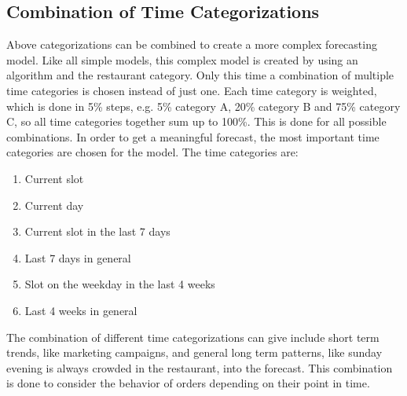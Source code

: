 \subsection{Combination of Time Categorizations}\label{subsection:Categorizing by Order}
Above categorizations can be combined to create a more complex forecasting model. Like all simple models, this complex model is created by using an algorithm and the restaurant category. Only this time a combination of multiple time categories is chosen instead of just one. Each time category is weighted, which is done in 5\% steps, e.g. 5\% category A, 20\% category B and 75\% category C, so all time categories together sum up to 100\%.  This is done for all possible combinations. In order to get a meaningful forecast, the most important time categories are chosen for the model. The time categories are:
\begin{enumerate}
\item Current slot
\item Current day
\item Current slot in the last 7 days
\item Last 7 days in general
\item Slot on the weekday in the last 4 weeks
\item Last 4 weeks in general
\end{enumerate}

The combination of different time categorizations can give include short term trends, like marketing campaigns, and general long term patterns, like sunday evening is always crowded in the restaurant, into the forecast.\newline
This combination is done to consider the behavior of orders depending on their point in time.
